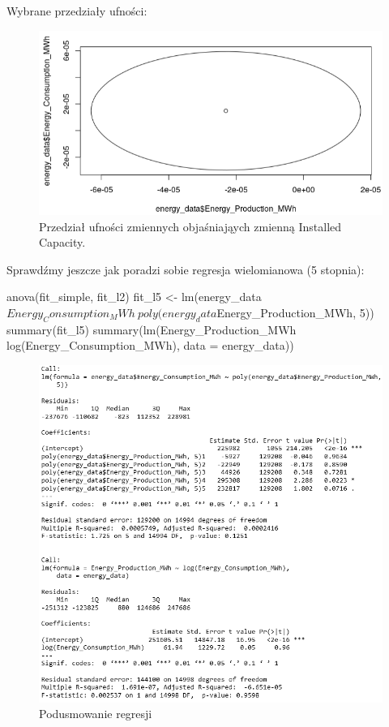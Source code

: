 Wybrane przedziały ufności:

\begin{figure}[H]
    \centering
    \includegraphics[width=1\linewidth]{lab1/obraz13.png}
    \caption{Przedział ufności zmiennych objaśniająych zmienną Installed Capacity.}
    \label{fig:enter-label}
\end{figure}

Sprawdźmy jeszcze jak poradzi sobie regresja wielomianowa (5 stopnia):

\begin{Rcode}
anova(fit_simple, fit_l2)
fit_l5 <- lm(energy_data$Energy_Consumption_MWh ~ poly(energy_data$Energy_Production_MWh, 5))
summary(fit_l5)
summary(lm(Energy_Production_MWh ~ log(Energy_Consumption_MWh), data = energy_data))
\end{Rcode}

\begin{figure}[H]
    \centering
    \includegraphics[width=1\linewidth]{lab1/obraz14.png}
    \caption{Podusmowanie regresji}
    \label{fig:enter-label}
\end{figure}